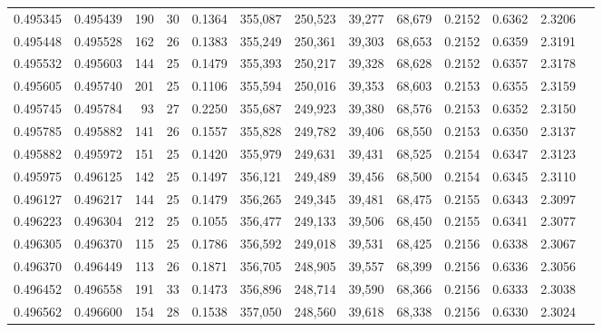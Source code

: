 \begin{tabular}{rrrrrrrrrrrrr}
0.495345 & 0.495439 & 190 &  30 &                                     0.1364 & 355,087 & 250,523 &  39,277 &  68,679 & 0.2152 & 0.6362 & 2.3206 \\
0.495448 & 0.495528 & 162 &  26 &                                     0.1383 & 355,249 & 250,361 &  39,303 &  68,653 & 0.2152 & 0.6359 & 2.3191 \\
0.495532 & 0.495603 & 144 &  25 &                                     0.1479 & 355,393 & 250,217 &  39,328 &  68,628 & 0.2152 & 0.6357 & 2.3178 \\
0.495605 & 0.495740 & 201 &  25 &                                     0.1106 & 355,594 & 250,016 &  39,353 &  68,603 & 0.2153 & 0.6355 & 2.3159 \\
0.495745 & 0.495784 &  93 &  27 &                                     0.2250 & 355,687 & 249,923 &  39,380 &  68,576 & 0.2153 & 0.6352 & 2.3150 \\
0.495785 & 0.495882 & 141 &  26 &                                     0.1557 & 355,828 & 249,782 &  39,406 &  68,550 & 0.2153 & 0.6350 & 2.3137 \\
0.495882 & 0.495972 & 151 &  25 &                                     0.1420 & 355,979 & 249,631 &  39,431 &  68,525 & 0.2154 & 0.6347 & 2.3123 \\
0.495975 & 0.496125 & 142 &  25 &                                     0.1497 & 356,121 & 249,489 &  39,456 &  68,500 & 0.2154 & 0.6345 & 2.3110 \\
0.496127 & 0.496217 & 144 &  25 &                                     0.1479 & 356,265 & 249,345 &  39,481 &  68,475 & 0.2155 & 0.6343 & 2.3097 \\
0.496223 & 0.496304 & 212 &  25 &                                     0.1055 & 356,477 & 249,133 &  39,506 &  68,450 & 0.2155 & 0.6341 & 2.3077 \\
0.496305 & 0.496370 & 115 &  25 &                                     0.1786 & 356,592 & 249,018 &  39,531 &  68,425 & 0.2156 & 0.6338 & 2.3067 \\
0.496370 & 0.496449 & 113 &  26 &                                     0.1871 & 356,705 & 248,905 &  39,557 &  68,399 & 0.2156 & 0.6336 & 2.3056 \\
0.496452 & 0.496558 & 191 &  33 &                                     0.1473 & 356,896 & 248,714 &  39,590 &  68,366 & 0.2156 & 0.6333 & 2.3038 \\
0.496562 & 0.496600 & 154 &  28 &                                     0.1538 & 357,050 & 248,560 &  39,618 &  68,338 & 0.2156 & 0.6330 & 2.3024 \\

\end{tabular}
